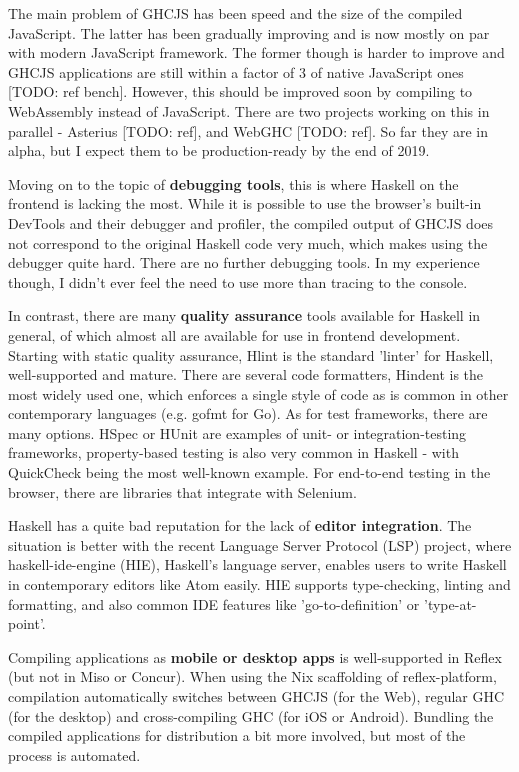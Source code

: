 \documentclass[english,odsaz]{fitthesis}
\begin{document}
The main problem of GHCJS has been speed and the size of the compiled
JavaScript. The latter has been gradually improving and is now mostly on par
with modern JavaScript framework. The former though is harder to improve and
GHCJS applications are still within a factor of 3 of native JavaScript ones
[TODO: ref bench]. However, this should be improved soon by compiling to
WebAssembly instead of JavaScript. There are two projects working on this in
parallel - Asterius [TODO: ref], and WebGHC [TODO: ref]. So far they are in
alpha, but I expect them to be production-ready by the end of 2019.

Moving on to the topic of \textbf{debugging tools}, this is where Haskell on the frontend
is lacking the most. While it is possible to use the browser's built-in DevTools
and their debugger and profiler, the compiled output of GHCJS does not
correspond to the original Haskell code very much, which makes using the
debugger quite hard. There are no further debugging tools. In my experience
though, I didn't ever feel the need to use more than tracing to the console.

In contrast, there are many \textbf{quality assurance} tools available for Haskell in
general, of which almost all are available for use in frontend
development. Starting with static quality assurance, Hlint is the standard
'linter' for Haskell, well-supported and mature. There are several code
formatters, Hindent is the most widely used one, which enforces a single style
of code as is common in other contemporary languages (e.g. gofmt for Go).
As for test frameworks, there are many options. HSpec or HUnit are examples of
unit- or integration-testing frameworks, property-based testing is also very
common in Haskell - with QuickCheck being the most well-known example. For
end-to-end testing in the browser, there are libraries that integrate with Selenium.

Haskell has a quite bad reputation for the lack of \textbf{editor integration}. The
situation is better with the recent Language Server Protocol (LSP) project,
where haskell-ide-engine (HIE), Haskell's language server, enables users to
write Haskell in contemporary editors like Atom easily. HIE supports
type-checking, linting and formatting, and also common IDE features like
'go-to-definition' or 'type-at-point'.

Compiling applications as \textbf{mobile or desktop apps} is well-supported in Reflex
(but not in Miso or Concur). When using the Nix scaffolding of reflex-platform,
compilation automatically switches between GHCJS (for the Web), regular GHC (for
the desktop) and cross-compiling GHC (for iOS or Android). Bundling the compiled
applications for distribution a bit more involved, but most of the process is
automated.
\end{document}
